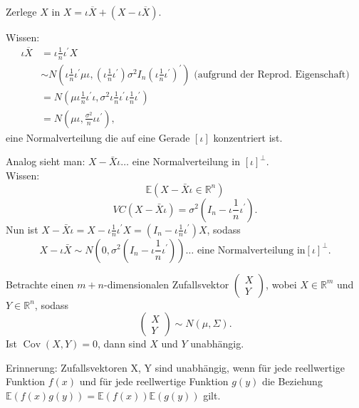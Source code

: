 \documentclass{tstextbook}
\begin{document}
\begin{example}
	Zerlege $X$ in $X=\iota\overline{X}+\left(X-\iota\overline{X}\right)$.
	
	Wissen:
	\begin{align*}
		\iota\overline{X} & =\iota\frac{1}{n}\iota^{\prime}X\\
		& \sim N\left(\iota\frac{1}{n}\iota^{\prime}\mu\iota,\left(\iota\frac{1}{n}\iota^{\prime}\right)\sigma^{2}I_{n}\left(\iota\frac{1}{n}\iota^{\prime}\right)^{\prime}\right)\text{ (aufgrund der Reprod. Eigenschaft)}\\
		& =N\left(\mu\iota\frac{1}{n}\iota^{\prime}\iota,\sigma^{2}\iota\frac{1}{n}\iota^{\prime}\iota\frac{1}{n}\iota^{\prime}\right)\\
		& =N\left(\mu\iota,\frac{\sigma^{2}}{n}\iota\iota^{\prime}\right),
	\end{align*}
	eine Normalverteilung die auf eine Gerade $[\iota]$ konzentriert
	ist.
	
	Analog sieht man:
	$X-\bar{X}\iota\ldots$ eine Normalverteilung in $ [\iota]^\perp. $\\
	Wissen: \\
	\[ \mathbb{E}\left( X-\bar{X}\iota\in\mathbb{R}^n\right) \]
	\[ VC\left(X-\bar{X}\iota\right)=\sigma^2\left(I_n-\iota\frac{1}{n}\iota^{\prime}\right). \]
	Nun ist $ X-\bar{X}\iota=X-\iota\frac{1}{n}\iota^{\prime}X=\left(I_n-\iota \frac{1}{n}\iota^{\prime}\right)X $, sodass \[ X-\iota\bar{X}\sim N\left(0,\sigma^2\left(I_n-\iota\frac{1}{n}\iota^{\prime}\right)\right)\ldots\text{ eine Normalverteilung in}[\iota]^{\perp}.\]
	
	\end{example}

\begin{theorem}
	
	Betrachte einen $ m+n $-dimensionalen Zufallsvektor $ \begin{pmatrix} X \\ Y\end{pmatrix} $, wobei $ X \in \mathbb{R}^m $ und $ Y \in \mathbb{R}^n $, sodass 
	\[ \begin{pmatrix}	X \\ Y \end{pmatrix} \sim N(\mu, \Sigma). \]
	Ist $ \operatorname{Cov} (X , Y) = 0 $, dann sind $ X $ und $ Y $ unabhängig.
\end{theorem}

\begin{remark}
	
	Erinnerung: Zufallsvektoren X, Y sind unabhängig, wenn für jede reellwertige Funktion $ f(x) $  und für jede reellwertige Funktion $ g(y) $ die Beziehung $ \mathbb{E}\left(f(x)g(y)\right)=\mathbb{E}\left(f(x)\right) \mathbb{E}\left(g(y)\right)$ gilt.
	
	\end{remark}
\end{document}
